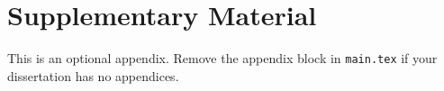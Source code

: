 \chapter{Supplementary Material}

This is an optional appendix. Remove the appendix block in \texttt{main.tex} if your dissertation has no appendices.
